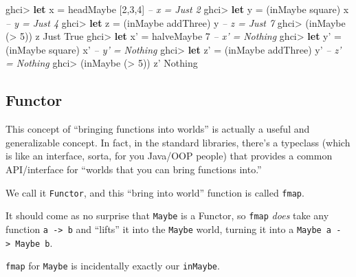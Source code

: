 \documentclass[]{article}
\newenvironment{Shaded}{}{}
\newcommand{\KeywordTok}[1]{\textcolor[rgb]{0.00,0.44,0.13}{\textbf{{#1}}}}
\newcommand{\DataTypeTok}[1]{\textcolor[rgb]{0.56,0.13,0.00}{{#1}}}
\newcommand{\DecValTok}[1]{\textcolor[rgb]{0.25,0.63,0.44}{{#1}}}
\newcommand{\CommentTok}[1]{\textcolor[rgb]{0.38,0.63,0.69}{\textit{{#1}}}}
\newcommand{\FunctionTok}[1]{\textcolor[rgb]{0.02,0.16,0.49}{{#1}}}
\newcommand{\NormalTok}[1]{{#1}}
\begin{document}
\begin{Shaded}
\begin{Highlighting}[]
\NormalTok{ghci}\FunctionTok{>} \KeywordTok{let} \NormalTok{x }\FunctionTok{=} \NormalTok{headMaybe [}\DecValTok{2}\NormalTok{,}\DecValTok{3}\NormalTok{,}\DecValTok{4}\NormalTok{]        }\CommentTok{-- x = Just 2}
\NormalTok{ghci}\FunctionTok{>} \KeywordTok{let} \NormalTok{y }\FunctionTok{=} \NormalTok{(inMaybe square) x       }\CommentTok{-- y = Just 4}
\NormalTok{ghci}\FunctionTok{>} \KeywordTok{let} \NormalTok{z }\FunctionTok{=} \NormalTok{(inMaybe addThree) y     }\CommentTok{-- z = Just 7}
\NormalTok{ghci}\FunctionTok{>} \NormalTok{(inMaybe (}\FunctionTok{>} \DecValTok{5}\NormalTok{)) z}
\DataTypeTok{Just} \DataTypeTok{True}
\NormalTok{ghci}\FunctionTok{>} \KeywordTok{let} \NormalTok{x' }\FunctionTok{=} \NormalTok{halveMaybe }\DecValTok{7}            \CommentTok{-- x' = Nothing}
\NormalTok{ghci}\FunctionTok{>} \KeywordTok{let} \NormalTok{y' }\FunctionTok{=} \NormalTok{(inMaybe square) x'     }\CommentTok{-- y' = Nothing}
\NormalTok{ghci}\FunctionTok{>} \KeywordTok{let} \NormalTok{z' }\FunctionTok{=} \NormalTok{(inMaybe addThree) y'   }\CommentTok{-- z' = Nothing}
\NormalTok{ghci}\FunctionTok{>} \NormalTok{(inMaybe (}\FunctionTok{>} \DecValTok{5}\NormalTok{)) z'}
\DataTypeTok{Nothing}
\end{Highlighting}
\end{Shaded}

\subsection{Functor}\label{functor}

This concept of ``bringing functions into worlds'' is actually a useful and generalizable concept.
In fact, in the standard libraries, there's a typeclass (which is like an interface, sorta, for you
Java/OOP people) that provides a common API/interface for ``worlds that you can bring functions
into.''

We call it \texttt{Functor}, and this ``bring into world'' function is called \texttt{fmap}.

It should come as no surprise that \texttt{Maybe} is a Functor, so \texttt{fmap} \emph{does} take
any function \texttt{a\ -\textgreater{}\ b} and ``lifts'' it into the \texttt{Maybe} world, turning
it into a \texttt{Maybe\ a\ -\textgreater{}\ Maybe\ b}.

\texttt{fmap} for \texttt{Maybe} is incidentally exactly our \texttt{inMaybe}.
\end{document}
